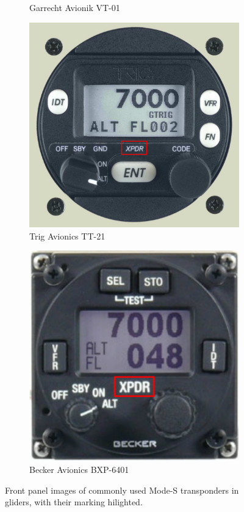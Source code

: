 \documentclass[twoside]{article}
\begin{document}
\begin{figure}
\begin{subfigure}[b]{0.24\textwidth}
	\caption{Garrecht Avionik VT-01}
	\label{fig:vt01}
\end{subfigure}
\begin{subfigure}[b]{0.24\textwidth}
	\includegraphics[width=\textwidth]{tt21}
	\caption{Trig Avionics TT-21}
	\label{fig:tt21}
\end{subfigure}
\begin{subfigure}[b]{0.24\textwidth}
	\includegraphics[width=\textwidth]{bxp6401}
	\caption{Becker Avionics {BXP-6401}}
	\label{fig:bxp6401}
\end{subfigure}
\caption{Front panel images of commonly used Mode-S transponders in gliders, with their marking hilighted.}
\end{figure}
\end{document}
